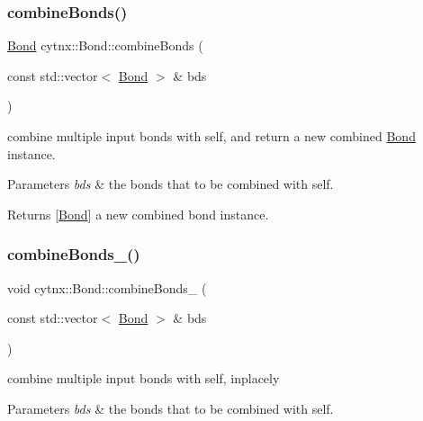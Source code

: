 \subsubsection{\texorpdfstring{combine\+Bonds()}{combineBonds()}}
{\footnotesize\ttfamily \hyperlink{classcytnx_1_1Bond}{Bond} cytnx\+::\+Bond\+::combine\+Bonds (\begin{DoxyParamCaption}\item[{const std\+::vector$<$ \hyperlink{classcytnx_1_1Bond}{Bond} $>$ \&}]{bds }\end{DoxyParamCaption})\hspace{0.3cm}{\ttfamily [inline]}}



combine multiple input bonds with self, and return a new combined \hyperlink{classcytnx_1_1Bond}{Bond} instance. 


\begin{DoxyParams}{Parameters}
{\em bds} & the bonds that to be combined with self. \\
\hline
\end{DoxyParams}
\begin{DoxyReturn}{Returns}
\mbox{[}\hyperlink{classcytnx_1_1Bond}{Bond}\mbox{]} a new combined bond instance. 
\end{DoxyReturn}
\mbox{\label{classcytnx_1_1Bond_a1fd655bfe0845839502b6e385d743078}} 
\subsubsection{\texorpdfstring{combine\+Bonds\+\_\+()}{combineBonds\_()}}
{\footnotesize\ttfamily void cytnx\+::\+Bond\+::combine\+Bonds\+\_\+ (\begin{DoxyParamCaption}\item[{const std\+::vector$<$ \hyperlink{classcytnx_1_1Bond}{Bond} $>$ \&}]{bds }\end{DoxyParamCaption})\hspace{0.3cm}{\ttfamily [inline]}}



combine multiple input bonds with self, inplacely 


\begin{DoxyParams}{Parameters}
{\em bds} & the bonds that to be combined with self. \\
\hline
\end{DoxyParams}
\mbox{\label{classcytnx_1_1Bond_aa072647e03a4c797479445bd41b9eacf}} 

